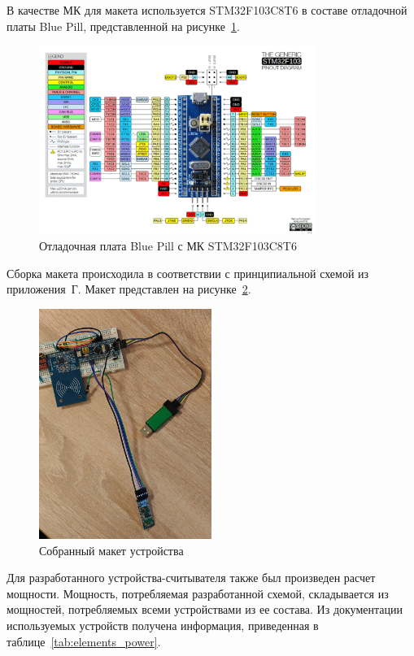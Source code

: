 В качестве МК для макета используется STM32F103C8T6 в составе отладочной платы Blue Pill, представленной на рисунке~\ref{fig:blue_pill}.

\begin{figure}[H]
    \centering
    \includegraphics[width=0.8\textwidth]{images/design/blue_pill}
    \caption{\centering Отладочная плата Blue Pill с МК STM32F103C8T6}
    \label{fig:blue_pill}
\end{figure}

Сборка макета происходила в соответствии с принципиальной схемой из приложения~Г.
Макет представлен на рисунке~\ref{fig:maket}.

\begin{figure}[h]
    \centering
    \includegraphics[width=0.5\textwidth]{images/design/maket}
    \caption{\centering Собранный макет устройства}
    \label{fig:maket}
\end{figure}

Для разработанного устройства-считывателя также был произведен расчет мощности.
Мощность, потребляемая разработанной схемой, складывается из мощностей, потребляемых всеми устройствами из ее состава.
Из документации используемых устройств получена информация, приведенная в таблице~\ref{tab:elements_power}.


